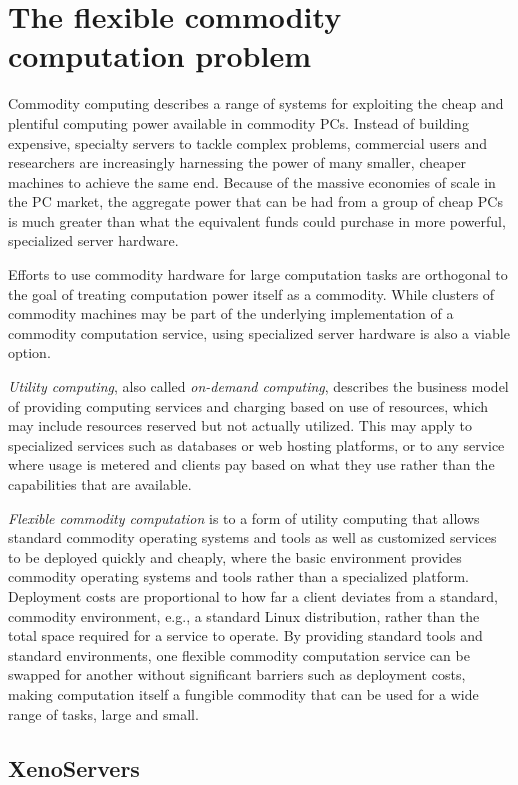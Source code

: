 \section{The flexible commodity computation problem}

Commodity computing describes a range of systems for exploiting the cheap and plentiful computing power available in commodity PCs. Instead of building expensive, specialty servers to tackle complex problems, commercial users and researchers are increasingly harnessing the power of many smaller, cheaper machines to achieve the same end. Because of the massive economies of scale in the PC market, the aggregate power that can be had from a group of cheap PCs is much greater than what the equivalent funds could purchase in more powerful, specialized server hardware.

Efforts to use commodity hardware for large computation tasks are orthogonal to the goal of treating computation power itself as a commodity. While clusters of commodity machines may be part of the underlying implementation of a commodity computation service, using specialized server hardware is also a viable option.

\emph{Utility computing}, also called \emph{on-demand computing}, describes the business model of providing computing services and charging based on use of resources, which may include resources reserved but not actually utilized. This may apply to specialized services such as databases or web hosting platforms, or to any service where usage is metered and clients pay based on what they use rather than the capabilities that are available.

\emph{Flexible commodity computation} is to a form of utility computing that allows standard commodity operating systems and tools as well as customized services to be deployed quickly and cheaply, where the basic environment provides commodity operating systems and tools rather than a specialized platform. Deployment costs are proportional to how far a client deviates from a standard, commodity environment, e.g., a standard Linux distribution, rather than the total space required for a service to operate. By providing standard tools and standard environments, one flexible commodity computation service can be swapped for another without significant barriers such as deployment costs, making computation itself a fungible commodity that can be used for a wide range of tasks, large and small.

\subsection{XenoServers}
